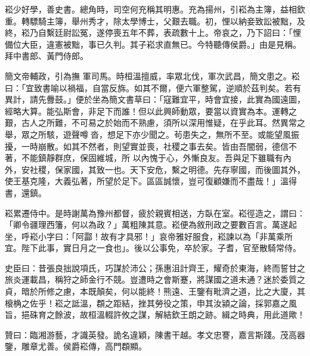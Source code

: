 \begin{pinyinscope}
 崧少好學，善史書。總角時，司空何充稱其明惠。充為揚州，引崧為主簿，益相欽重。轉驃騎主簿，舉州秀才，除太學博士，父艱去職。初，悝以納妾致訟被黜，及終，崧乃自繫廷尉訟冤，遂停喪五年不葬，表疏數十上。帝哀之，乃下詔曰：「悝備位大臣，違憲被黜，事已久判。其子崧求直無已。今特聽傳侯爵。」由是見稱。拜中書郎、黃門侍郎。



 簡文帝輔政，引為撫
 軍司馬。時桓溫擅威，率眾北伐，軍次武昌，簡文患之。崧曰：「宜致書喻以禍福，自當反旆。如其不爾，便六軍整駕，逆順於茲判矣。若有異計，請先釁鼓。」便於坐為簡文書草曰：「寇難宜平，時會宜接，此實為國遠圖，經略大算。能弘斯會，非足下而誰！但以此興師動眾，要當以資實為本。運轉之艱，古人之所難，不可易之於始而不熟慮，須所以深用惟疑，在乎此耳。然異常之舉，眾之所駭，遊聲噂沓，想足下亦少聞之。茍患失之，無所不至。或能望風振擾，一時崩散。如其不然者，則望實並喪，社稷之事去矣。皆由吾闇弱，德信不著，不能鎮靜群庶，保固維城，所
 以內愧于心，外慚良友。吾與足下雖職有內外，安社稷，保家國，其致一也。天下安危，繫之明德。先存寧國，而後圖其外，使王基克隆，大義弘著，所望於足下。區區誠懷，豈可復顧嫌而不盡哉！」溫得書，還鎮。



 崧累遷侍中。是時謝萬為豫州都督，疲於親賓相送，方臥在室。崧徑造之，謂曰：「卿令疆理西籓，何以為政？」萬粗陳其意。崧便為敘刑政之要數百言。萬遂起坐，呼崧小字曰：「阿酃！故有才具邪！」哀帝雅好服食，崧諫以為「非萬乘所宜。陛下此事，實日月之一食也」。後以公事免，卒於家。子耆，官至散騎常侍。



 史臣曰：昔張良拙說項氏，巧謀於沛公；孫惠沮計齊王，耀奇於東海，終而誓甘之旅炎運載昌，稱狩之師金行不競。豈遭時之會斯蹇，將謀國之道未通？迷於委質之貞，暗於所修之慮，本既顛矣，何以能終！熊遠、王鑒有毗濟之道，比之大廈，其榱桷之佐乎！崧之詆溫，頵之距結，挫其勞役之策，申其汝潁之論，採郭嘉之風旨，挹硃育之餘波，故桓溫輟許攸之謀，解結欽王朗之跡。緝之時典，用此道歟！



 贊曰：臨湘游藝，才識英發。詭名違穎，陳書干越。孝文忠謇，嘉言斯踐。茂高器鑒，雕章尤善。侯爵崧傳，高門頵顯。



\end{pinyinscope}